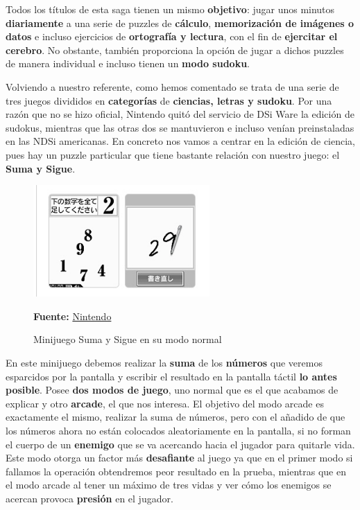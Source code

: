 \vspace{0.5cm}

Todos los títulos de esta saga tienen un mismo \textbf{objetivo}: jugar unos minutos \textbf{diariamente} a una serie de puzzles de \textbf{cálculo}, \textbf{memorización de imágenes o datos} e incluso ejercicios de \textbf{ortografía y lectura}, con el fin de \textbf{ejercitar el cerebro}. No obstante, también proporciona la opción de jugar a dichos puzzles de manera individual e incluso tienen un \textbf{modo sudoku}.

\vspace{0.5cm}

Volviendo a nuestro referente, como hemos comentado se trata de una serie de tres juegos divididos en \textbf{categorías} de \textbf{ciencias, letras y sudoku}. Por una razón que no se hizo oficial, Nintendo quitó del servicio de DSi Ware la edición de sudokus, mientras que las otras dos se mantuvieron e incluso venían preinstaladas en las NDSi americanas. En concreto nos vamos a centrar en la edición de ciencia, pues hay un puzzle particular que tiene bastante relación con nuestro juego: el \textbf{Suma y Sigue}.

\begin{figure}[htbp]
\centering
  \includegraphics[width=0.6\textwidth]{archivos/brain-sumtotaled1.jpg}
  \caption{Minijuego Suma y Sigue en su modo normal}
    \textbf{Fuente:} \href{https://www.nintendo.co.jp/ds/dsiware/kndjknrj/training2/index.html}{Nintendo}
  \label{fig:sumtotaled1}
\end{figure}

\vspace{0.5cm}

En este minijuego debemos realizar la \textbf{suma} de los \textbf{números} que veremos esparcidos por la pantalla y escribir el resultado en la pantalla táctil \textbf{lo antes posible}. Posee \textbf{dos modos de juego}, uno normal que es el que acabamos de explicar y otro \textbf{arcade}, el que nos interesa. El objetivo del modo arcade es exactamente el mismo, realizar la suma de números, pero con el añadido de que los números ahora no están colocados aleatoriamente en la pantalla, si no forman el cuerpo de un \textbf{enemigo} que se va acercando hacia el jugador para quitarle vida. Este modo otorga un factor más \textbf{desafiante} al juego ya que en el primer modo si fallamos la operación obtendremos peor resultado en la prueba, mientras que en el modo arcade al tener un máximo de tres vidas y ver cómo los enemigos se acercan provoca \textbf{presión} en el jugador.

